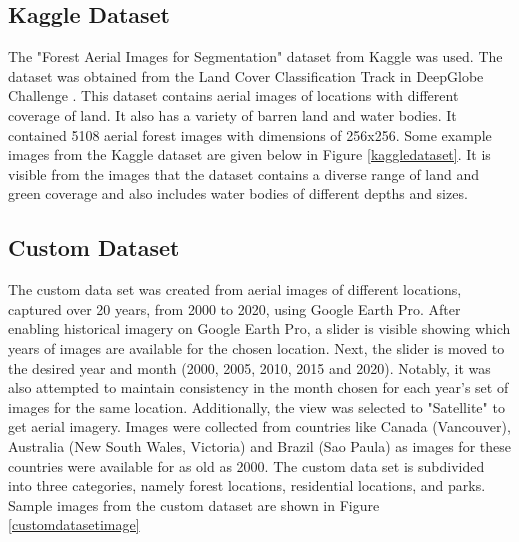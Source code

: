 \subsection{ Kaggle Dataset}
The "Forest Aerial Images for Segmentation" dataset from Kaggle was used. The dataset was obtained from the Land Cover Classification Track in DeepGlobe Challenge . This dataset contains aerial images of locations with different coverage of land. It also has a variety of barren land and water bodies.  It contained 5108 aerial forest images with dimensions of 256x256. Some example images from the Kaggle dataset are given below in Figure \ref{kaggledataset}. It is visible from the images that the dataset contains a diverse range of land and green coverage and also includes water bodies of different depths and sizes.




\subsection{Custom Dataset}
 The custom data set was created from aerial images of different locations, captured over 20 years, from 2000 to 2020,
using Google Earth Pro. After enabling historical imagery on Google Earth Pro, a slider is visible showing which years of images are available for the chosen location. Next, the slider is moved to the desired year and month (2000, 2005, 2010, 2015 and 2020). Notably, it was also attempted to maintain consistency in the month chosen for each year's set of images for the same location. Additionally, the view was selected to "Satellite" to get aerial imagery. Images were collected from countries like Canada (Vancouver), Australia (New South Wales, Victoria) and Brazil (Sao Paula)
as images for these countries were available for as old as 2000. The custom data set is subdivided into three categories, namely forest locations, residential locations, and parks. Sample images from the custom dataset are shown in Figure \ref{customdatasetimage}






